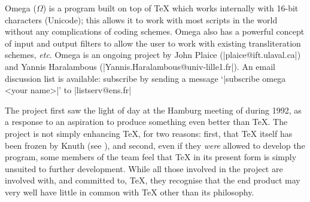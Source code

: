 \begin{changemargin}{-1cm}{-1cm}

Omega
\htmlignore
($\Omega$)
\endhtmlignore
is a program built on top of \TeX{} which works internally with 16-bit
characters (Unicode); this allows it to work with most scripts in the
world without any complications of coding schemes.  Omega also has a
powerful concept of input and output filters to allow the user to work
with existing transliteration schemes, \emph{etc}.  Omega is an
ongoing project by John Plaice (\Email|plaice@ift.ulaval.ca|) and
Yannis Haralambous (\Emaildot|Yannis.Haralambous@univ-lille1.fr|).  An
email discussion list is available: subscribe by sending a message
`|subscribe omega <your name>|' to \Email|listserv@ens.fr|


The \NTS{} project first saw the light of day at the Hamburg meeting
of  during 1992, as a response to an aspiration to
produce something even better than \TeX{}.  The project is not simply
enhancing \TeX{}, for two reasons: first, that \TeX{} itself has been
frozen by Knuth
(see ), and second,
even if they \emph{were} allowed to develop the program, some members
of the \NTS{} team feel that \TeX{} in its present form is simply
unsuited to further development.  While all those involved in the
project are involved with, and committed to, \TeX{}, they recognise
that the end product may very well have little in common with \TeX{}
other than its philosophy.



\end{changemargin}
